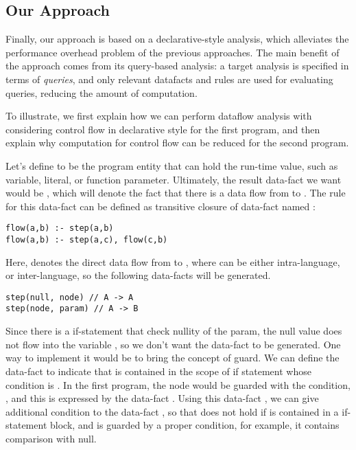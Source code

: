 \subsection{Our Approach}

Finally, our approach is based on a declarative-style analysis, which
alleviates the performance overhead problem of the previous approaches.
The main benefit of the approach comes from its query-based analysis:
a target analysis is
specified in terms of \textit{queries}, and only relevant datafacts and rules
are used for evaluating queries, reducing the amount of computation.

To illustrate, we first explain how we can perform dataflow analysis with
considering control flow in declarative style for the first program, and then
explain why computation for control flow can be reduced for the second program.

  Let's define  to be the program entity that can hold the run-time
value, such as variable, literal, or function parameter.
  Ultimately, the result data-fact we want would be , which will denote the
fact that there is a data flow from  to .
  The rule for this data-fact can be defined as transitive closure of data-fact named :
\begin{lstlisting}[style=myDatalog,xleftmargin=2.5em]
flow(a,b) :- step(a,b)
flow(a,b) :- step(a,c), flow(c,b)
\end{lstlisting}
Here,  denotes the direct data
flow from  to , where 
can be either intra-language, or inter-language, so the following data-facts
will be generated.
\begin{lstlisting}[style=myDatalog,xleftmargin=2.5em]
step(null, node) // A -> A
step(node, param) // A -> B
\end{lstlisting}
Since there is a if-statement that check  nullity of the param, the null value
does not flow into the variable , so we don't want the data-fact
 to be generated.  One way to implement it would be
to bring the concept of guard. We can define the data-fact  to indicate that  is contained in the scope of if
statement whose condition is . In the first program, the
 node would be guarded with the condition, ,
and this is expressed by the data-fact .
Using this data-fact , we can give additional condition to the
data-fact , so that  does not hold if
 is contained in a if-statement block, and is guarded by a
proper condition, for example, it contains comparison with null.

